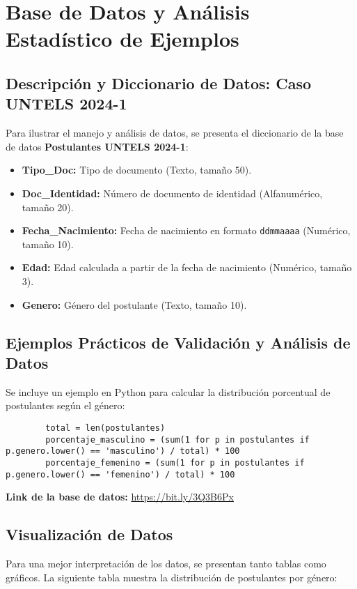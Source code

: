 	\section{Base de Datos y Análisis Estadístico de Ejemplos}
	
	\subsection{Descripción y Diccionario de Datos: Caso UNTELS 2024-1}
	Para ilustrar el manejo y análisis de datos, se presenta el diccionario de la base de datos \textbf{Postulantes UNTELS 2024-1}:
	\begin{itemize}
		\item \textbf{Tipo\_Doc:} Tipo de documento (Texto, tamaño 50).
		\item \textbf{Doc\_Identidad:} Número de documento de identidad (Alfanumérico, tamaño 20).
		\item \textbf{Fecha\_Nacimiento:} Fecha de nacimiento en formato \texttt{ddmmaaaa} (Numérico, tamaño 10).
		\item \textbf{Edad:} Edad calculada a partir de la fecha de nacimiento (Numérico, tamaño 3).
		\item \textbf{Genero:} Género del postulante (Texto, tamaño 10).
	\end{itemize}
	
	\subsection{Ejemplos Prácticos de Validación y Análisis de Datos}
	Se incluye un ejemplo en Python para calcular la distribución porcentual de postulantes según el género:
	
	\begin{verbatim}
		total = len(postulantes)
		porcentaje_masculino = (sum(1 for p in postulantes if p.genero.lower() == 'masculino') / total) * 100
		porcentaje_femenino = (sum(1 for p in postulantes if p.genero.lower() == 'femenino') / total) * 100
	\end{verbatim}
	
	\textbf{Link de la base de datos:} \url{https://bit.ly/3Q3B6Px}
	
	\subsection{Visualización de Datos}
	Para una mejor interpretación de los datos, se presentan tanto tablas como gráficos. La siguiente tabla muestra la distribución de postulantes por género:
	

